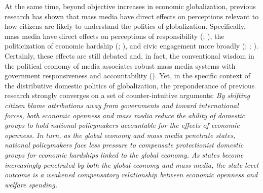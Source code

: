 \documentclass[12pt]{report}
\begin{document}
At the same time, beyond objective increases in economic globalization, previous research has shown
that mass media have direct effects on perceptions relevant to how citizens are likely to understand
the politics of globalization. Specifically, mass media have direct effects on perceptions of
responsibility (\citealt{Iyengar:1987uo}; \citealt{Iyengar:1991uf}), the politicization of economic
hardship (\citealt{Mutz:1992ww}; \citealt{Mutz:1994kp}), and civic engagement more broadly
(\citealt{Putnam:1995vj}; \citealt{Norris:2000uf}; \citealt{Hooghe:2002bi}). Certainly, these
effects are still debated and, in fact, the conventional wisdom in the political economy of media
associates robust mass media systems with government responsiveness and accountability
(\citealt{JamesMSnyder:2012th,Besley:2002tg,Adsera:2003cc}). Yet, in the specific context of the
distributive domestic politics of globalization, the preponderance of previous research strongly
converges on a set of counter-intuitive arguments: \emph{By shifting citizen blame attributions away
from governments and toward international forces, both economic openness and mass media reduce the
ability of domestic groups to hold national policymakers accountable for the effects of economic
openness. In turn, as the global economy and mass media penetrate states, national policymakers face
less pressure to compensate protectionist domestic groups for economic hardships linked to the
global economy. As states become increasingly penetrated by both the global economy and mass media,
the state-level outcome is a weakened compensatory relationship between economic openness and
welfare spending.}
\end{document}
